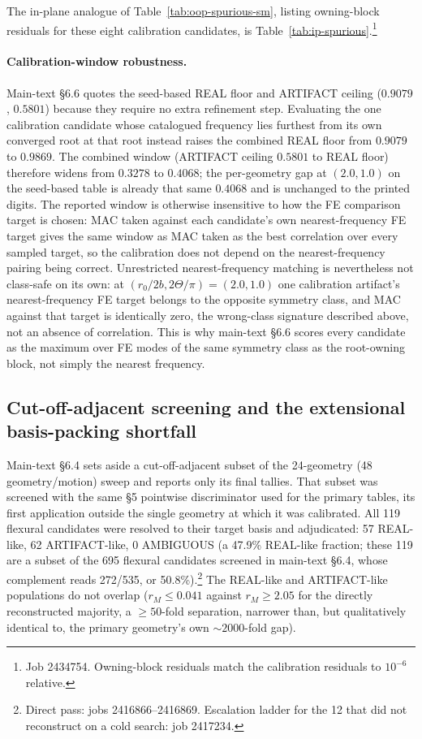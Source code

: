 \documentclass[11pt]{article}
\begin{document}
The in-plane analogue of Table~\ref{tab:oop-spurious-sm}, listing
owning-block residuals for these eight calibration candidates, is
Table~\ref{tab:ip-spurious}.\footnote{Job 2434754. Owning-block residuals
match the calibration residuals to $10^{-6}$ relative.}

\paragraph{Calibration-window robustness.} Main-text \S6.6 quotes the
seed-based REAL floor and ARTIFACT ceiling ($0.9079$, $0.5801$) because they
require no extra refinement step. Evaluating the one calibration
candidate whose catalogued frequency lies furthest from its own
converged root at that root instead raises the combined REAL floor from
$0.9079$ to $0.9869$. The combined window (ARTIFACT ceiling $0.5801$ to
REAL floor) therefore widens from $0.3278$ to $0.4068$; the
per-geometry gap at $(2.0,1.0)$ on the seed-based table is already that
same $0.4068$ and is unchanged to the printed digits. The reported window is
otherwise insensitive to how the FE comparison target is chosen: MAC
taken against each candidate's own nearest-frequency FE target gives the
same window as MAC taken as the best correlation over every sampled
target, so the calibration does not depend on the nearest-frequency
pairing being correct. Unrestricted nearest-frequency matching is
nevertheless not class-safe on its own: at
$(r_0/2b,2\Theta/\pi)=(2.0,1.0)$ one calibration artifact's
nearest-frequency FE target belongs to the opposite symmetry class, and
MAC against that target is identically zero, the wrong-class
signature described above, not an absence of correlation. This is why
main-text \S6.6 scores every candidate as the maximum over FE modes of
the same symmetry class as the root-owning block, not simply the
nearest frequency.

\subsection{Cut-off-adjacent screening and the extensional basis-packing
shortfall}\label{sec:cutoff-appendix}
Main-text \S6.4 sets aside a cut-off-adjacent subset of the 24-geometry
(48 geometry/motion) sweep and reports only its final tallies. That subset was screened with
the same \S5 pointwise discriminator used for the primary tables, its
first application outside the single geometry at which it was calibrated.
All 119 flexural candidates
were resolved to their target basis and adjudicated: 57 REAL-like, 62
ARTIFACT-like, 0 AMBIGUOUS (a 47.9\% REAL-like fraction; these 119 are a
subset of the 695 flexural candidates screened in main-text \S6.4, whose
complement reads 272/535, or 50.8\%).\footnote{Direct
pass: jobs 2416866--2416869. Escalation ladder for the 12 that did not
reconstruct on a cold search: job 2417234.} The REAL-like and
ARTIFACT-like populations do not overlap ($r_M\le0.041$ against
$r_M\ge2.05$ for the directly reconstructed majority, a $\ge50$-fold
separation, narrower than, but qualitatively identical to, the
primary geometry's own ${\sim}2000$-fold gap).
\end{document}
